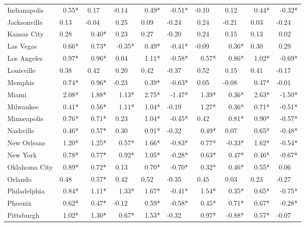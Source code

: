 \begin{tabular}{lrrrrrrrrr}
	Indianapolis   &   0.55* &  0.17~~ & -0.14~~ &   0.49* &  -0.51* & -0.10~~ &  0.12~~ &   0.44* &  -0.32* \\
	Jacksonville   &  0.13~~ & -0.04~~ &  0.25~~ &  0.09~~ & -0.24~~ &  0.24~~ & -0.21~~ &  0.03~~ & -0.24~~ \\
	Kansas City    &  0.28~~ &   0.40* &  0.23~~ &  0.27~~ & -0.20~~ &  0.24~~ &  0.15~~ &  0.13~~ &  0.02~~ \\
	Las Vegas      &   0.66* &   0.73* &  -0.35* &   0.49* &  -0.41* & -0.09~~ &   0.36* &  0.30~~ &  0.29~~ \\
	Los Angeles    &   0.97* &   0.96* &  0.04~~ &   1.11* &  -0.58* &   0.57* &   0.86* &   1.02* &  -0.69* \\
	Louisville     &  0.38~~ &  0.42~~ &  0.20~~ &  0.42~~ & -0.37~~ &  0.52~~ &  0.15~~ &  0.41~~ & -0.17~~ \\
	Memphis        &   0.74* &   0.96* & -0.23~~ &   0.39* &  -0.63* &  0.05~~ & -0.08~~ &   0.47* & -0.01~~ \\
	Miami          &   2.08* &   1.88* &   1.13* &   2.75* &  -1.47* &   1.39* &   0.36* &   2.63* &  -1.50* \\
	Milwaukee      &   0.41* &   0.56* &   1.11* &   1.04* & -0.19~~ &   1.27* &   0.36* &   0.71* &  -0.51* \\
	Minneapolis    &   0.76* &   0.71* &  0.23~~ &   1.04* &  -0.45* &  0.42~~ &   0.81* &   0.90* &  -0.57* \\
	Nashville      &   0.46* &   0.57* &  0.30~~ &   0.91* & -0.32~~ &   0.49* &  0.07~~ &   0.65* &  -0.48* \\
	New Orleans    &   1.20* &   1.25* &   0.57* &   1.66* &  -0.83* &   0.77* &  -0.33* &   1.62* &  -0.54* \\
	New York       &   0.78* &   0.77* &   0.92* &   1.05* &  -0.28* &   0.63* &   0.47* &   0.46* &  -0.67* \\
	Oklahoma City  &   0.89* &   0.72* &  0.13~~ &   0.70* &  -0.70* &   0.32* &   0.46* &   0.55* &  0.06~~ \\
	Orlando        &  0.48~~ &   0.57* &  0.42~~ &  0.52~~ & -0.35~~ &  0.45~~ &  0.03~~ &  0.23~~ & -0.27~~ \\
	Philadelphia   &   0.84* &   1.11* &   1.33* &   1.67* &  -0.41* &   1.54* &   0.35* &   0.65* &  -0.75* \\
	Phoenix        &   0.62* &   0.47* & -0.12~~ &   0.59* &  -0.58* &   0.45* &   0.71* &   0.67* &  -0.28* \\
	Pittsburgh     &   1.02* &   1.30* &   0.67* &   1.53* & -0.32~~ &   0.97* &  -0.88* &   0.57* & -0.07~~ \\

\end{tabular}
